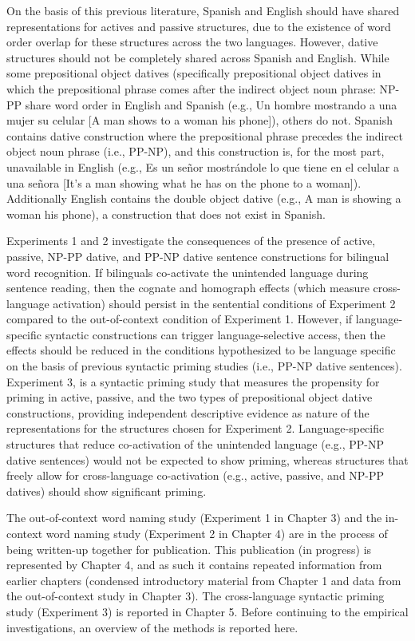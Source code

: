 On the basis of this previous literature, Spanish and English should have shared representations for actives and passive structures, due to the existence of word order overlap for these structures across the two languages. However, dative structures should not be completely shared across Spanish and English. While some prepositional object datives (specifically prepositional object datives in which the prepositional phrase comes after the indirect object noun phrase: NP-PP share word order in English and Spanish (e.g., Un hombre mostrando a una mujer su celular [A man shows to a woman his phone]), others do not. Spanish contains dative construction where the prepositional phrase precedes the indirect object noun phrase (i.e., PP-NP), and this construction is, for the most part, unavailable in English (e.g., Es un se\~{n}or mostr\'{a}ndole lo que tiene en el celular a una se\~{n}ora [It's a man showing what he has on the phone to a woman]). Additionally English contains the double object dative (e.g., A man is showing a woman his phone), a construction that does not exist in Spanish. 

Experiments 1 and 2 investigate the consequences of the presence of active, passive, NP-PP dative, and PP-NP dative sentence constructions for bilingual word recognition. If bilinguals co-activate the unintended language during sentence reading, then the cognate and homograph effects (which measure cross-language activation) should persist in the sentential conditions of Experiment 2 compared to the out-of-context condition of Experiment 1. However, if language-specific syntactic constructions can trigger language-selective access, then the effects should be reduced in the conditions hypothesized to be language specific on the basis of previous syntactic priming studies (i.e., PP-NP dative sentences). Experiment 3, is a syntactic priming study that measures the propensity for priming in active, passive, and the two types of prepositional object dative constructions, providing independent descriptive evidence as nature of the representations for the structures chosen for Experiment 2. Language-specific structures that reduce co-activation of the unintended language (e.g., PP-NP dative sentences) would not be expected to show priming, whereas structures that freely allow for cross-language co-activation (e.g., active, passive, and NP-PP datives) should show significant priming. 

The out-of-context word naming study (Experiment 1 in Chapter 3) and the in-context word naming study (Experiment 2 in Chapter 4) are in the process of being written-up together for publication. This publication (in progress) is represented by Chapter 4, and as such it contains repeated information from earlier chapters (condensed introductory material from Chapter 1 and data from the out-of-context study in Chapter 3). The cross-language syntactic priming study (Experiment 3) is reported in Chapter 5. Before continuing to the empirical investigations, an overview of the methods is reported here. 

